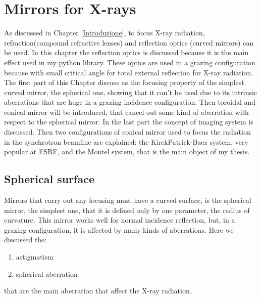 \chapter{Mirrors for X-rays}
\label{capitolo2}
\thispagestyle{empty}
\vspace{0.5cm}

\noindent As discussed in Chapter \ref{Introduzione}, to focus X-ray radiation, refraction(compound refractive lenses) and reflection optics (curved mirrors) can be used. In this chapter the reflection optics is discussed because it is the main effect used in my python library. These optics are used in a grazing configuration because with small critical angle for total external reflection for X-ray radiation. The first part of this Chapter discuss as the focusing property of the simplest curved mirror, the spherical one, showing that it can't be used due to its intrinsic aberrations that are huge in a grazing incidence configuration. Then toroidal and conical mirror will be introduced, that cancel out some kind of aberration with respect to the spherical mirror. In the last part the concept of imaging system is discussed. Then  two configurations of conical mirror used to focus the radiation in the synchrotron beamline are explained: the KirckPatrick-Baez system, very popular at ESRF, and the Montel system, that is the main object of my thesis.

\section{Spherical surface}
\noindent Mirrors that carry out any focusing must have a curved surface, is the spherical mirror, the simplest one, that it is defined only by one parameter, the radius of curvature. This mirror works well for normal incidence reflection, but, in a grazing configuration, it is affected by many kinds of aberrations. Here we discussed the:
\begin{enumerate}
\item astigmatism
\item spherical aberration
\end{enumerate}
that are the main aberration that affect the X-ray radiation.
